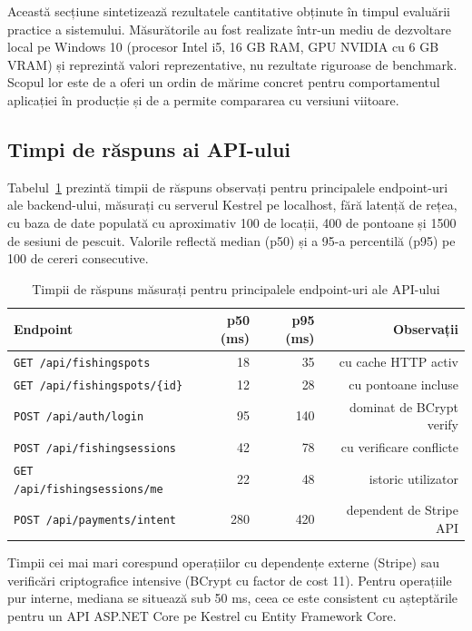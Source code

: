 Această secțiune sintetizează rezultatele cantitative obținute în timpul evaluării practice a sistemului. Măsurătorile au fost realizate într-un mediu de dezvoltare local pe Windows 10 (procesor Intel i5, 16 GB RAM, GPU NVIDIA cu 6 GB VRAM) și reprezintă valori reprezentative, nu rezultate riguroase de benchmark. Scopul lor este de a oferi un ordin de mărime concret pentru comportamentul aplicației în producție și de a permite compararea cu versiuni viitoare.

\subsection{Timpi de răspuns ai API-ului}

Tabelul~\ref{tab:timp-raspuns-api} prezintă timpii de răspuns observați pentru principalele endpoint-uri ale backend-ului, măsurați cu serverul Kestrel pe localhost, fără latență de rețea, cu baza de date populată cu aproximativ 100 de locații, 400 de pontoane și 1500 de sesiuni de pescuit. Valorile reflectă median (p50) și a 95-a percentilă (p95) pe 100 de cereri consecutive.

\begin{table}[H]
\centering
\caption{Timpii de răspuns măsurați pentru principalele endpoint-uri ale API-ului}
\label{tab:timp-raspuns-api}
\begin{tabular}{lrrr}
\hline
\textbf{Endpoint} & \textbf{p50 (ms)} & \textbf{p95 (ms)} & \textbf{Observații} \\
\hline
\texttt{GET /api/fishingspots}          & 18  & 35  & cu cache HTTP activ \\
\texttt{GET /api/fishingspots/\{id\}}   & 12  & 28  & cu pontoane incluse \\
\texttt{POST /api/auth/login}           & 95  & 140 & dominat de BCrypt verify \\
\texttt{POST /api/fishingsessions}      & 42  & 78  & cu verificare conflicte \\
\texttt{GET /api/fishingsessions/me}    & 22  & 48  & istoric utilizator \\
\texttt{POST /api/payments/intent}      & 280 & 420 & dependent de Stripe API \\
\hline
\end{tabular}
\end{table}

Timpii cei mai mari corespund operațiilor cu dependențe externe (Stripe) sau verificări criptografice intensive (BCrypt cu factor de cost 11). Pentru operațiile pur interne, mediana se situează sub 50 ms, ceea ce este consistent cu așteptările pentru un API ASP.NET Core pe Kestrel cu Entity Framework Core.

